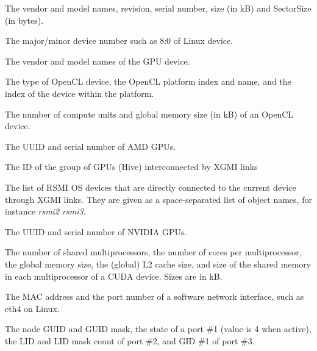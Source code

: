 \begin{DoxyDescription}
\item[Vendor, Model, Revision, Serial\+Number, Size, Sector\+Size (Block OS devices) ]The vendor and model names, revision, serial number, size (in kB) and Sector\+Size (in bytes).  
\item[Linux\+Device\+ID (Block OS devices) ]The major/minor device number such as 8\+:0 of Linux device.  
\item[G\+P\+U\+Vendor, G\+P\+U\+Model (G\+PU or Co-\/\+Processor OS devices) ]The vendor and model names of the G\+PU device.  
\item[Open\+C\+L\+Device\+Type, Open\+C\+L\+Platform\+Index, ]
\item[Open\+C\+L\+Platform\+Name, Open\+C\+L\+Platform\+Device\+Index (Open\+CL OS devices) ]The type of Open\+CL device, the Open\+CL platform index and name, and the index of the device within the platform.  
\item[Open\+C\+L\+Compute\+Units, Open\+C\+L\+Global\+Memory\+Size (Open\+CL OS devices) ]The number of compute units and global memory size (in kB) of an Open\+CL device.  
\item[A\+M\+D\+U\+U\+ID, A\+M\+D\+Serial (R\+S\+MI G\+PU OS devices) ]The U\+U\+ID and serial number of A\+MD G\+P\+Us.  
\item[X\+G\+M\+I\+Hive\+ID (R\+S\+MI G\+PU OS devices) ]The ID of the group of G\+P\+Us (Hive) interconnected by X\+G\+MI links  
\item[X\+G\+M\+I\+Peers (R\+S\+MI G\+PU OS devices) ]The list of R\+S\+MI OS devices that are directly connected to the current device through X\+G\+MI links. They are given as a space-\/separated list of object names, for instance {\itshape rsmi2 rsmi3}.  
\item[N\+V\+I\+D\+I\+A\+U\+U\+ID, N\+V\+I\+D\+I\+A\+Serial (N\+V\+ML G\+PU OS devices) ]The U\+U\+ID and serial number of N\+V\+I\+D\+IA G\+P\+Us.  
\item[C\+U\+D\+A\+Multi\+Processors, C\+U\+D\+A\+Cores\+Per\+MP, ]
\item[C\+U\+D\+A\+Global\+Memory\+Size, C\+U\+D\+A\+L2\+Cache\+Size, C\+U\+D\+A\+Shared\+Memory\+Size\+Per\+MP (C\+U\+DA OS devices) ]The number of shared multiprocessors, the number of cores per multiprocessor, the global memory size, the (global) L2 cache size, and size of the shared memory in each multiprocessor of a C\+U\+DA device. Sizes are in kB.  
\item[Address, Port (Network interface OS devices) ]The M\+AC address and the port number of a software network interface, such as {\ttfamily eth4} on Linux.  
\item[Node\+G\+U\+ID, Sys\+Image\+G\+U\+ID, Port1\+State, Port2\+L\+ID, Port2\+L\+MC, Port3\+G\+I\+D1 (Open\+Fabrics OS devices) ]The node G\+U\+ID and G\+U\+ID mask, the state of a port \#1 (value is 4 when active), the L\+ID and L\+ID mask count of port \#2, and G\+ID \#1 of port \#3.  
\end{DoxyDescription}

